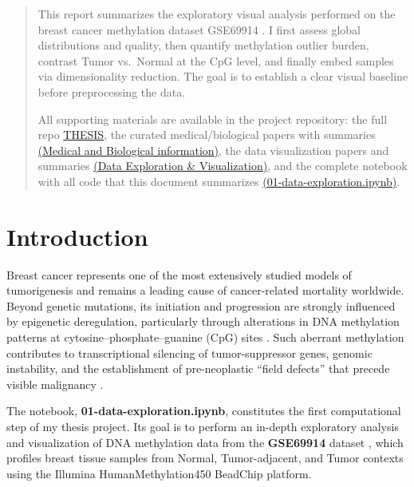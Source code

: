 \documentclass[10pt]{extarticle}
\begin{document}
\begin{abstract}
This report summarizes the exploratory visual analysis performed on the breast cancer methylation dataset GSE69914 \cite{ref6}. I first assess global distributions and quality, then quantify methylation outlier burden, contrast Tumor vs.\ Normal at the CpG level, and finally embed samples via dimensionality reduction. The goal is to establish a clear visual baseline before preprocessing the data. 

All supporting materials are available in the project repository: the full repo \href{https://github.com/elisabettaroviera/THESIS}{THESIS}, the curated medical/biological papers with summaries \href{https://github.com/elisabettaroviera/THESIS/tree/main/02%20-%20Paper/01%20-%20Medical%20and%20Biological%20information}{(Medical and Biological information)}, the data visualization papers and summaries \href{https://github.com/elisabettaroviera/THESIS/tree/main/02%20-%20Paper/03%20-%20Data%20EXPLORATION%20\%26%20VISUALIZATION}{(Data Exploration \& Visualization)}, and the complete notebook with all code that this document summarizes \href{https://github.com/elisabettaroviera/THESIS/blob/main/01%20-%20Notebook/01-data-exploration.ipynb}{(01-data-exploration.ipynb)}.
 
\end{abstract}

\section{Introduction}

Breast cancer represents one of the most extensively studied models of tumorigenesis and remains a leading cause of cancer-related mortality worldwide. 
Beyond genetic mutations, its initiation and progression are strongly influenced by epigenetic deregulation, particularly through alterations in DNA methylation patterns at cytosine–phosphate–guanine (CpG) sites \cite{ref4} \cite{ref8}. 
Such aberrant methylation contributes to transcriptional silencing of tumor-suppressor genes, genomic instability, and the establishment of pre-neoplastic “field defects” that precede visible malignancy \cite{ref12}.

The notebook, \textbf{01-data-exploration.ipynb}, constitutes the first computational step of my thesis project. 
Its goal is to perform an in-depth exploratory analysis and visualization of DNA methylation data from the \textbf{GSE69914} dataset \cite{ref6}, which profiles breast tissue samples from Normal, Tumor-adjacent, and Tumor contexts using the Illumina HumanMethylation450 BeadChip platform. 
\end{document}

